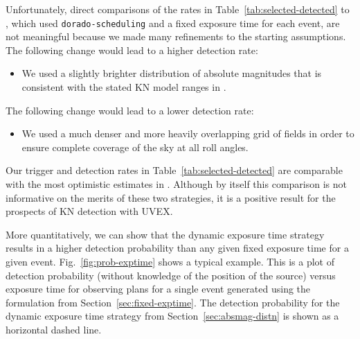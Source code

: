 \documentclass[twocolumn,times]{aastex631}
\begin{document}
Unfortunately, direct comparisons of the rates in Table~\ref{tab:selected-detected} to \citet{2025arXiv250114109C}, which used \texttt{dorado-scheduling} and a fixed exposure time for each event, are not meaningful because we made many refinements to the starting assumptions. The following change would lead to a higher detection rate:
%
\begin{itemize}
    \item We used a slightly brighter distribution of absolute magnitudes that is consistent with the stated \ac{KN} model ranges in \citet{2021arXiv211115608K}.
\end{itemize}
%
The following change would lead to a lower detection rate:
%
\begin{itemize}
    \item We used a much denser and more heavily overlapping grid of fields in order to ensure complete coverage of the sky at all roll angles.
\end{itemize}
%
Our trigger and detection rates in Table~\ref{tab:selected-detected} are comparable with the most optimistic estimates in \citet{2025arXiv250114109C}. Although by itself this comparison is not informative on the merits of these two strategies, it is a positive result for the prospects of \ac{KN} detection with \ac{UVEX}.

More quantitatively, we can show that the dynamic exposure time strategy results in a higher detection probability than any given fixed exposure time for a given event. Fig.~\ref{fig:prob-exptime} shows a typical example. This is a plot of detection probability (without knowledge of the position of the source) versus exposure time for observing plans for a single event generated using the formulation from Section~\ref{sec:fixed-exptime}. The detection probability for the dynamic exposure time strategy from Section~\ref{sec:absmag-distn} is shown as a horizontal dashed line.
\end{document}
